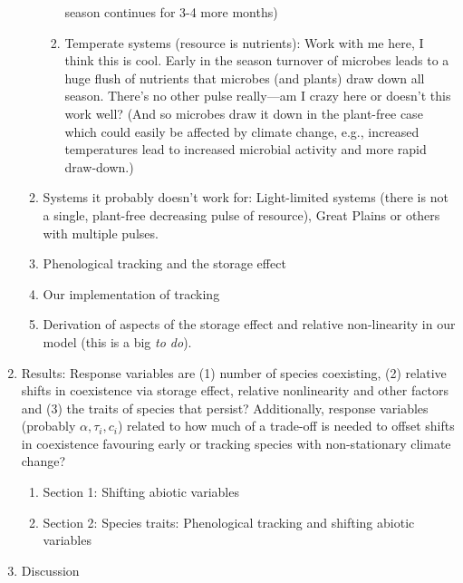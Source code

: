 \documentclass[11pt,a4paper,oneside]{article}
\begin{document}
\begin{enumerate}
\begin{enumerate}
\begin{enumerate}
  season continues for 3-4 more months)
\item Temperate systems (resource is nutrients): Work with me here, I
  think this is cool. Early in the season turnover of microbes leads
  to a huge flush of nutrients \citep{Zak:1990ar} that microbes (and plants) draw down
  all season. There's no other pulse really---am I crazy here or
  doesn't this work well? (And so microbes draw it down in the
  plant-free case which could easily be affected by climate change,
  e.g., increased temperatures lead to increased microbial activity
  and more rapid draw-down.)
\end{enumerate}
\item Systems it probably doesn't work for: Light-limited systems
  (there is not a single, plant-free decreasing pulse of resource),
  Great Plains or others with multiple pulses.
\item Phenological tracking and the storage effect
\item Our implementation of tracking
\item Derivation of aspects of the storage effect and relative
  non-linearity in our model (this is a big \emph{to do}).
\end{enumerate}
\item Results: Response variables are (1) number of species coexisting, (2) relative shifts in coexistence via storage effect, relative nonlinearity and other factors and (3) the traits of species that persist? Additionally, response variables (probably \(\alpha, \tau_{i}, c_{i}\)) related to how much of a trade-off is needed to offset shifts in coexistence favouring early or tracking species with non-stationary climate change?
\begin{enumerate}
\item Section 1: Shifting abiotic variables
\item Section 2: Species traits: Phenological tracking and shifting
  abiotic variables
\end{enumerate}
\item Discussion
\end{enumerate}
\end{document}
